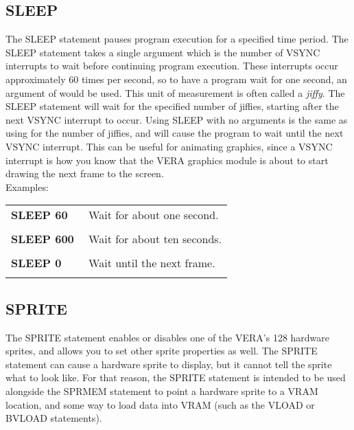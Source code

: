 
\subsection{SLEEP}

The {\ttfamily SLEEP} statement pauses program execution for a specified time
period.  The {\ttfamily SLEEP} statement takes a single argument which is the
number of VSYNC interrupts to wait before continuing program execution.  These
interrupts occur approximately 60 times per second, so to have a program wait
for one second, an argument of {} would be used.  This unit of
measurement is often called a \emph{jiffy}.  The {\ttfamily SLEEP} statement
will wait for the specified number of jiffies, starting after the next VSYNC
interrupt to occur.  Using {\ttfamily SLEEP} with no arguments is the same as
using {} for the number of jiffies, and will cause the program to
wait until the next VSYNC interrupt.  This can be useful for animating
graphics, since a VSYNC interrupt is how you know that the VERA graphics module
is about to start drawing the next frame to the screen.\\

Examples:\\

\begin{tabular}{l p{0.65\linewidth}}

	{\ttfamily\bfseries SLEEP 60}&Wait for about one second.\\\\

	{\ttfamily\bfseries SLEEP 600}&Wait for about ten seconds.\\\\

	{\ttfamily\bfseries SLEEP 0}&Wait until the next frame.\\\\

\end{tabular}

\subsection{SPRITE}

The {\ttfamily SPRITE} statement enables or disables one of the VERA's 128
hardware sprites, and allows you to set other sprite properties as well.  The
{\ttfamily SPRITE} statement can cause a hardware sprite to display, but it
cannot tell the sprite what to look like.  For that reason, the {\ttfamily
SPRITE} statement is intended to be used alongside the {\ttfamily SPRMEM}
statement to point a hardware sprite to a VRAM location, and some way to load
data into VRAM (such as the {\ttfamily VLOAD} or {\ttfamily BVLOAD}
statements).\\

